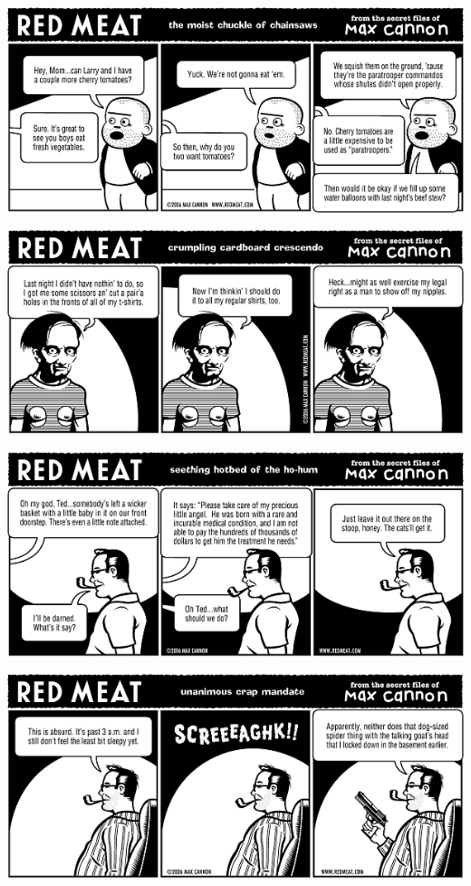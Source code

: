 \documentclass[a4paper,twoside,11pt]{article}
\begin{document}
\includegraphics[width=\textwidth]{redmeat_2006-03-14.png}



\includegraphics[width=\textwidth]{redmeat_2006-03-21.png}



\includegraphics[width=\textwidth]{redmeat_2006-03-28.png}



\includegraphics[width=\textwidth]{redmeat_2006-04-04.png}
\end{document}
